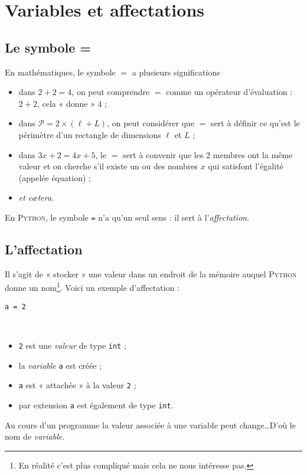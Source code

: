\chapter{Variables et affectations}

\section{Le symbole =}

En mathématiques, le symbole $=$ a plusieurs significations
\begin{itemize}
	\item dans $2+2=4$, on peut comprendre $=$ comme un opérateur d'évaluation : $2+2$, cela « donne » $4$ ;
	\item dans $\mathcal{P}=2\times(\ell+L)$, on peut considérer que $=$ sert à définir ce qu'est le périmètre d'un rectangle de dimensions $\ell$ et $L$ ;
	\item dans $3x + 2 = 4x +5$, le $=$ sert à convenir que les 2 membres ont la même valeur et on cherche s'il existe un ou des nombres $x$ qui satisfont l'égalité (appelée équation) ;
	\item \textit{et cætera}.
\end{itemize}

En \textsc{Python}, le symbole \texttt{=}  n'a qu'un seul sens : il sert à l'\textit{affectation}.

\section{L'affectation}
Il s'agit de « stocker » une valeur dans un endroit de la mémoire auquel \textsc{Python} donne un nom\footnote{En réalité c'est plus compliqué mais cela ne nous intéresse pas.}. Voici un exemple d'affectation :
\begin{center}\Large
	\texttt{a = 2}
\end{center}\
\begin{itemize}
	\item   \texttt{2} est une \textit{valeur} de type \texttt{int} ;
	\item   la \textit{variable} \texttt{a} est créée ;\
	\item   \texttt{a} est « attachée » à la valeur \texttt{2} ;
	\item   par extension \texttt{a} est également de type \texttt{int}.
\end{itemize}
Au cours d'un programme la valeur associée à une variable peut change\ldots D'où le nom de \textit{variable}.\\


